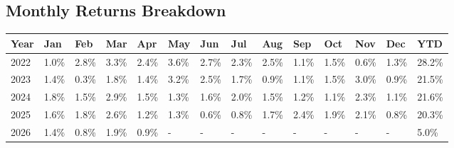 \documentclass[11pt]{article}
\begin{document}
\subsection*{Monthly Returns Breakdown}
\begin{table}[h]
\centering
\renewcommand{\arraystretch}{1.3}
\begin{tabularx}{\textwidth}{l *{13}{>{\centering\arraybackslash}X}}
\toprule
\textbf{Year} & \textbf{Jan} & \textbf{Feb} & \textbf{Mar} & \textbf{Apr} & \textbf{May} & \textbf{Jun} & \textbf{Jul} & \textbf{Aug} & \textbf{Sep} & \textbf{Oct} & \textbf{Nov} & \textbf{Dec} & \textbf{YTD} \\
\midrule
2022 & \cellcolor{posgreen!10!white}1.0\% & \cellcolor{posgreen!27!white}2.8\% & \cellcolor{posgreen!32!white}3.3\% & \cellcolor{posgreen!24!white}2.4\% & \cellcolor{posgreen!35!white}3.6\% & \cellcolor{posgreen!27!white}2.7\% & \cellcolor{posgreen!23!white}2.3\% & \cellcolor{posgreen!25!white}2.5\% & \cellcolor{posgreen!11!white}1.1\% & \cellcolor{posgreen!14!white}1.5\% & \cellcolor{posgreen!5!white}0.6\% & \cellcolor{posgreen!13!white}1.3\% & \cellcolor{posgreen!100!white}28.2\% \\
2023 & \cellcolor{posgreen!13!white}1.4\% & \cellcolor{posgreen!2!white}0.3\% & \cellcolor{posgreen!17!white}1.8\% & \cellcolor{posgreen!13!white}1.4\% & \cellcolor{posgreen!31!white}3.2\% & \cellcolor{posgreen!24!white}2.5\% & \cellcolor{posgreen!17!white}1.7\% & \cellcolor{posgreen!8!white}0.9\% & \cellcolor{posgreen!10!white}1.1\% & \cellcolor{posgreen!15!white}1.5\% & \cellcolor{posgreen!30!white}3.0\% & \cellcolor{posgreen!9!white}0.9\% & \cellcolor{posgreen!100!white}21.5\% \\
2024 & \cellcolor{posgreen!17!white}1.8\% & \cellcolor{posgreen!15!white}1.5\% & \cellcolor{posgreen!28!white}2.9\% & \cellcolor{posgreen!14!white}1.5\% & \cellcolor{posgreen!12!white}1.3\% & \cellcolor{posgreen!16!white}1.6\% & \cellcolor{posgreen!19!white}2.0\% & \cellcolor{posgreen!15!white}1.5\% & \cellcolor{posgreen!11!white}1.2\% & \cellcolor{posgreen!11!white}1.1\% & \cellcolor{posgreen!22!white}2.3\% & \cellcolor{posgreen!11!white}1.1\% & \cellcolor{posgreen!100!white}21.6\% \\
2025 & \cellcolor{posgreen!15!white}1.6\% & \cellcolor{posgreen!18!white}1.8\% & \cellcolor{posgreen!26!white}2.6\% & \cellcolor{posgreen!11!white}1.2\% & \cellcolor{posgreen!12!white}1.3\% & \cellcolor{posgreen!5!white}0.6\% & \cellcolor{posgreen!8!white}0.8\% & \cellcolor{posgreen!16!white}1.7\% & \cellcolor{posgreen!23!white}2.4\% & \cellcolor{posgreen!19!white}1.9\% & \cellcolor{posgreen!20!white}2.1\% & \cellcolor{posgreen!8!white}0.8\% & \cellcolor{posgreen!100!white}20.3\% \\
2026 & \cellcolor{posgreen!13!white}1.4\% & \cellcolor{posgreen!7!white}0.8\% & \cellcolor{posgreen!18!white}1.9\% & \cellcolor{posgreen!8!white}0.9\% & - & - & - & - & - & - & - & - & \cellcolor{posgreen!49!white}5.0\% \\
\bottomrule
\end{tabularx}
\end{table}
\end{document}
